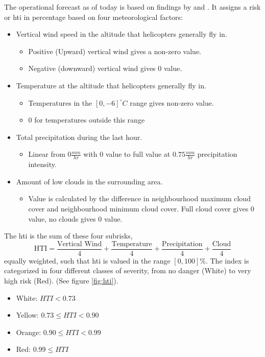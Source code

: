 The operational forecast as of today is based on findings by \cite{hardwick1999} and \cite{wilkinson2013}. It assigns a risk or \acrfull{hti} in percentage based on four meteorological factors:
\begin{itemize}
    \item Vertical wind speed in the altitude that helicopters generally fly in.
    \begin{itemize}
        \item Positive (Upward) vertical wind gives a non-zero value.
        \item Negative (downward) vertical wind gives 0 value.
    \end{itemize}
    \item Temperature at the altitude that helicopters generally fly in.
    \begin{itemize}
        \item Temperatures in the $[0,-6] ^{\circ}C$ range gives non-zero value. 
        \item 0 for temperatures outside this range
    \end{itemize}
    \item Total precipitation during the last hour.
    \begin{itemize}
        \item Linear from $0\frac{mm}{hr}$ with 0 value to full value at $0.75\frac{mm}{hr}$ precipitation intensity.
    \end{itemize}
    \item Amount of low clouds in the surrounding area.
    \begin{itemize}
        \item Value is calculated by the difference in neighbourhood maximum cloud cover and neighbourhood minimum cloud cover. Full cloud cover gives 0 value, no clouds gives 0 value.
    \end{itemize} 

\end{itemize}
The \acrshort{hti} is the sum of these four subrisks, \[\text{HTI} = \frac{\text{Vertical Wind}}{4} + \frac{\text{Temperature}}{4} + \frac{\text{Precipitation}}{4} +\frac{\text{Cloud}}{4}\] equally weighted, such that \acrshort{hti} is valued in the range $[0,100]\%$. The index is categorized in four different classes of severity, from no danger (White) to very high risk (Red). (See figure \ref{fig:hti}).
\begin{itemize}
    \item White: $HTI < 0.73$
    \item Yellow: $0.73 \leq HTI < 0.90 $
    \item Orange: $0.90 \leq HTI < 0.99 $
    \item Red: $0.99 \leq HTI $
\end{itemize}
